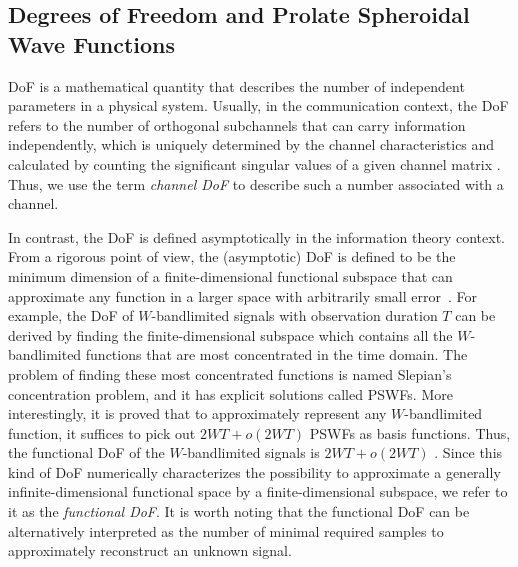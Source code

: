 \documentclass[journal,twocolumn]{IEEEtran}
\begin{document}


\subsection{Degrees of Freedom and Prolate Spheroidal Wave Functions}
\label{Sec_2_Subsec_1}
DoF is a mathematical quantity that describes the number of independent parameters in a physical system. 
Usually, in the communication context, the DoF refers to the number of orthogonal subchannels that can carry information independently, which is uniquely determined by the channel characteristics and calculated by counting the significant singular values of a given channel matrix \cite{goldsmith2003capacity}. 
Thus, we use the term {{\emph{channel DoF}}} to describe such a number associated with a channel.

In contrast, the DoF is defined asymptotically in the information theory context. From a rigorous point of view, the (asymptotic) DoF is defined to be the minimum dimension of a finite-dimensional functional subspace that can approximate any function in a larger space with arbitrarily small error~\cite{poon2005degrees}. For example, the DoF of $W$-bandlimited signals with observation duration $T$ can be derived by finding the finite-dimensional subspace which contains all the $W$-bandlimited functions that are most concentrated in the time domain. The problem of finding these most concentrated functions is named Slepian's concentration problem, and it has explicit solutions called PSWFs.
More interestingly, it is proved that to approximately represent any $W$-bandlimited function, it suffices to pick out $2WT+o(2WT)$ PSWFs as basis functions. Thus, the functional DoF of the $W$-bandlimited signals is $2WT+o(2WT)$ \cite{slepian1976bandwidth}. 
Since this kind of DoF numerically characterizes the possibility to approximate a generally infinite-dimensional functional space by a finite-dimensional subspace, we refer to it as the {{\emph{functional DoF}}}. 
It is worth noting that the functional DoF can be alternatively interpreted as the number of minimal required samples to approximately reconstruct an unknown signal. 
\end{document}
